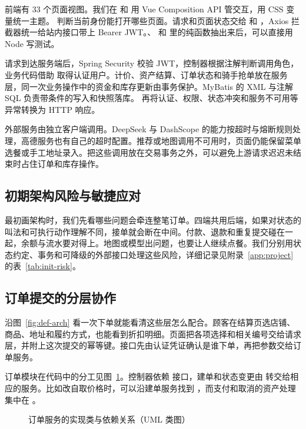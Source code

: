前端有 33 个页面视图。我们在  和  用 Vue Composition API 管交互，用 CSS 变量统一主题。 判断当前身份能打开哪些页面。请求和页面状态交给  和 ，Axios 拦截器统一给站内接口带上 Bearer JWT。、 和  里的纯函数抽出来后，可以直接用 Node 写测试。

请求到达服务端后，Spring Security 校验 JWT，控制器根据注解判断调用角色，业务代码借助  取得认证用户。计价、资产结算、订单状态和骑手抢单放在服务层，同一次业务操作中的资金和库存更新由事务保护。MyBatis 的 XML 与注解 SQL 负责带条件的写入和快照落库。 再将认证、权限、状态冲突和服务不可用等异常转换为 HTTP 响应。

外部服务由独立客户端调用。DeepSeek 与 DashScope 的能力按超时与熔断规则处理，高德服务也有自己的超时配置。推荐或地图调用不可用时，页面仍能保留菜单选餐或手工地址录入。把这些调用放在交易事务之外，可以避免上游请求迟迟未结束时占住订单和库存操作。

\subsection{初期架构风险与敏捷应对}

最初画架构时，我们先看哪些问题会牵连整笔订单。四端共用后端，如果对状态的叫法和可执行动作理解不同，接单就会断在中间。付款、退款和重复提交碰在一起，余额与流水要对得上。地图或模型出问题，也要让人继续点餐。我们分别用状态约定、事务和可降级的外部接口处理这些风险，详细记录见附录~\ref{app:project} 的表~\ref{tab:init-risk}。

\subsection{订单提交的分层协作}

沿图~\ref{fig:def-arch} 看一次下单就能看清这些层怎么配合。顾客在结算页选店铺、商品、地址和履约方式，也能看到折扣明细。页面把各项选择和相关编号交给请求层，并附上这次提交的幂等键。接口先由认证凭证确认是谁下单，再把参数交给订单服务。

订单模块在代码中的分工见图~\ref{fig:def-order-service-uml}。控制器依赖  接口，建单和状态变更由  转交给相应的服务。比如改自取价格时，可以沿建单服务找到 ，而支付和取消的资产处理集中在 。

\begin{figure}[!htbp]
  \centering
  
  \caption{订单服务的实现类与依赖关系（UML 类图）}\label{fig:def-order-service-uml}
\end{figure}

